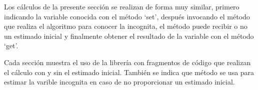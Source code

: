 	Los cálculos de la presente sección se realizan de forma muy similar, primero indicando la variable conocida con el método `set', después invocando el método que realiza el algoritmo para conocer la incognita, el método puede recibir o no un estimado inicial y finalmente obtener el resultado de la variable con el método `get'.

	Cada sección muestra el uso de la librería con fragmentos de código que realizan el cálculo con y sin el estimado inicial. También se indica que método se usa para estimar la varible incognita en caso de no proporcionar un estimado inicial.

		

		